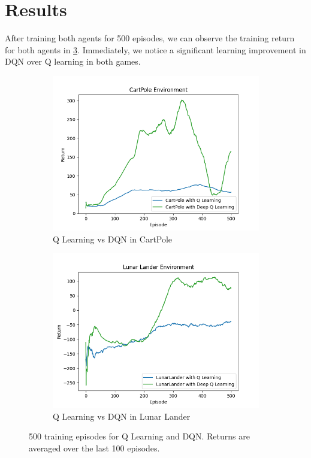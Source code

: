 \documentclass{article}
\begin{document}
\section{Results}

After training both agents for 500 episodes, we can observe the training return
for both agents in \cref{fig:train}. Immediately, we notice a significant
learning improvement in DQN over Q learning in both games.

\begin{figure}
      \centering
      \begin{subfigure}[H]{0.49\textwidth}
            \centering
            \includegraphics[width=\textwidth]{cartpole}
            \caption{Q Learning vs DQN in CartPole}
            \label{fig:cartpole}
      \end{subfigure}
      \begin{subfigure}[H]{0.49\textwidth}
            \centering
            \includegraphics[width=\textwidth]{lunar}
            \caption{Q Learning vs DQN in Lunar Lander}
            \label{fig:lunar}
      \end{subfigure}
      \caption{500 training episodes for Q Learning and DQN. Returns are averaged over the last 100 episodes.}
      \label{fig:train}
\end{figure}
\end{document}
